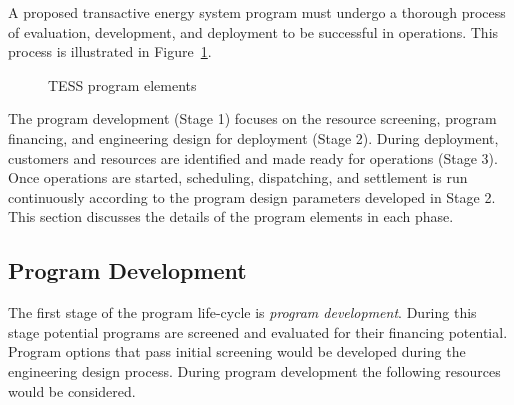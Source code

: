 A proposed transactive energy system program must undergo a thorough process of evaluation, development, and deployment to be successful in operations.  This process is illustrated in Figure~\ref{fig:tess_program_elements}.
\begin{figure}[!t]
    \centerline { \scalebox{0.5} { }}
    \caption{TESS program elements}
    \label{fig:tess_program_elements}
\end{figure}
The program development (Stage 1) focuses on the resource screening, program financing, and engineering design for deployment (Stage 2).  During deployment, customers and resources are identified and made ready for operations (Stage 3).  Once operations are started, scheduling, dispatching, and settlement is run continuously according to the program design parameters developed in Stage 2. This section discusses the details of the program elements in each phase.

\subsection{Program Development}

The first stage of the program life-cycle is \textit{program development}. During this stage potential programs are screened and evaluated for their financing potential.  Program options that pass initial screening would be developed during the engineering design process. During program development the following resources would be considered.

